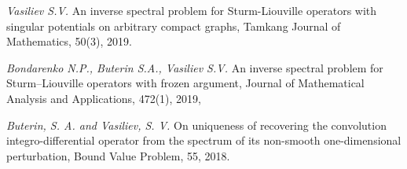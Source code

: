 {\small
\begin{zitemize}
\item  \textit{Vasiliev S.V.} An inverse spectral problem for Sturm-Liouville operators with singular potentials on arbitrary compact graphs, Tamkang
Journal of Mathematics, 50(3), 2019.

\item \textit{Bondarenko N.P., Buterin S.A., Vasiliev S.V.} An inverse spectral problem for Sturm–Liouville operators with frozen argument,
Journal of Mathematical Analysis and Applications, 472(1), 2019,

\item \textit{Buterin, S. A. and Vasiliev, S. V.} On uniqueness of recovering the convolution integro-differential operator from the spectrum of its
non-smooth one-dimensional perturbation, Bound Value Problem, 55, 2018.
\end{zitemize}
}
